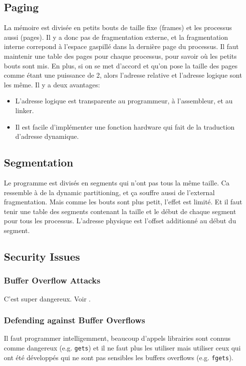 \subsection{Paging}
La mémoire est divisée en petits bouts de taille fixe (frames) et les processus aussi (pages).
Il y a donc pas de fragmentation externe, et la fragmentation interne correpond à l'espace gaspillé dans la dernière page du processus.
Il faut maintenir une table des pages pour chaque processus, pour savoir où les petits bouts sont mis.
En plus, si on se met d'accord et qu'on pose la taille des pages comme étant une puissance de 2, alors l'adresse relative et l'adresse logique sont les même.
Il y a deux avantages:
\begin{itemize}
  \item L'adresse logique est transparente au programmeur, à l'assembleur, et au linker.
  \item Il est facile d'implémenter une fonction hardware qui fait de la traduction d'adresse
    dynamique.
\end{itemize}

\subsection{Segmentation}
Le programme est divisés en segments qui n'ont pas tous la même taille.
Ca ressemble à de la dynamic partitioning, et ça souffre aussi de l'external fragmentation.
Mais comme les bouts sont plus petit, l'effet est limité.
Et il faut tenir une table des segments contenant la taille et le début de chaque segment pour tous les processus.
L'adresse physique est l'offset additionné au début du segment.

\subsection{Security Issues}
\subsubsection{Buffer Overflow Attacks}
C'est super dangereux.
Voir \cite[p.~327-330]{stallings}.

\subsubsection{Defending against Buffer Overflows}
Il faut programmer intelligemment,
beaucoup d'appels librairies sont connus comme dangereux (e.g. \lstinline|gets|)
et il ne faut plus les utiliser mais utiliser ceux qui ont été développés
qui ne sont pas sensibles les buffers overflows (e.g. \lstinline|fgets|).

